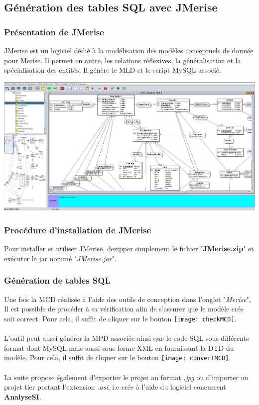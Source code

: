  \subsection{Génération des tables SQL avec JMerise}

 \subsubsection{Présentation de JMerise}
JMerise est un logiciel dédié à la modélisation des modèles conceptuels de donnée pour Merise. Il permet en autre, les relations réflexives, la généralisation et la spécialisation des entités. Il génère le MLD et le script MySQL associé.
\begin{center}
\includegraphics[scale=0.2]{Images/jmerise}
\end{center}

 \subsubsection{Procédure d'installation de JMerise}
Pour installer et utiliser JMerise, dezipper simplement le fichier "\textbf{JMerise.zip}" et exécuter le jar nommé "\textit{JMerise.jar}". 

 \subsubsection{Génération de tables SQL}
Une fois la MCD réalisée à l'aide des outils de conception dans l'onglet "\textit{Merise}", Il est possible de procéder à sa vérification afin de s'assurer que le modèle crée soit correct.
Pour cela, il suffit de cliquer sur le bouton \texttt{[image: checkMCD]}.\\\\
L'outil peut aussi générer la MPD associée ainsi que le code SQL sous différents format dont MySQL mais aussi sous forme XML en fournissant la DTD du modèle. Pour cela, il suffit de cliquer sur le bouton \texttt{[image: convertMCD]}.\\\\
La suite propose également d'exporter le projet au format \textit{.jpg} ou d'importer un projet tier portant l'extension \textit{.asi}, i.e crée à l'aide du logiciel concurrent \textbf{AnalyseSI}.

